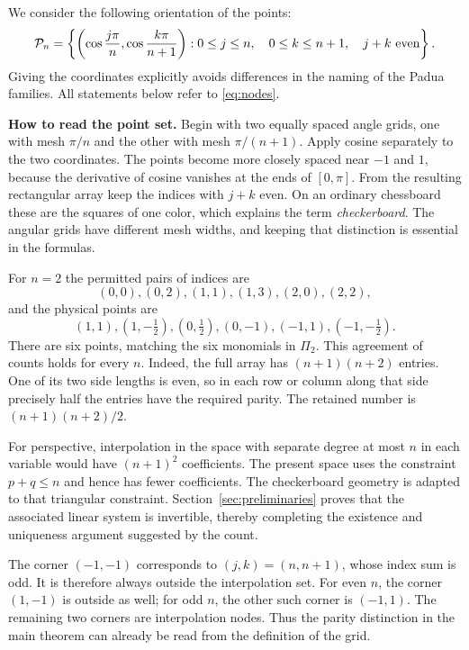We consider the following orientation of the points:
\begin{equation}\label{eq:nodes}
 \mathcal P_n=\left\{\left(\cos\frac{j\pi}{n},
                   \cos\frac{k\pi}{n+1}\right):
 0\leq j\leq n,\quad 0\leq k\leq n+1,\quad j+k\ \hbox{even}\right\}.
\end{equation}
Giving the coordinates explicitly avoids differences in the naming of the
Padua families. All statements below refer to \eqref{eq:nodes}.

\noindent\textbf{How to read the point set.}
Begin with two equally spaced angle grids, one with mesh $\pi/n$ and
the other with mesh $\pi/(n+1)$. Apply cosine separately to the two
coordinates. The points become more closely spaced near $-1$ and $1$,
because the derivative of cosine vanishes at the ends of $[0,\pi]$.
From the resulting rectangular array keep the indices with $j+k$ even.
On an ordinary chessboard these are the squares of one color, which
explains the term \emph{checkerboard}. The angular grids have different
mesh widths, and keeping that distinction is essential in the formulas.

For $n=2$ the permitted pairs of indices are
\[
 (0,0),(0,2),(1,1),(1,3),(2,0),(2,2),
\]
and the physical points are
\[
 (1,1),(1,-\tfrac12),(0,\tfrac12),(0,-1),
 (-1,1),(-1,-\tfrac12).
\]
There are six points, matching the six monomials in $\Pi_2$.
This agreement of counts holds for every $n$. Indeed, the full array has
$(n+1)(n+2)$ entries. One of its two side lengths is even, so in each row
or column along that side precisely half the entries have the required
parity. The retained number is $(n+1)(n+2)/2$.

For perspective, interpolation in the space with separate degree at
most $n$ in each variable would have $(n+1)^2$ coefficients. The present
space uses the constraint $p+q\leq n$ and hence has fewer coefficients.
The checkerboard geometry is adapted to that triangular constraint.
Section~\ref{sec:preliminaries} proves that the associated linear system
is invertible, thereby completing the existence and uniqueness argument
suggested by the count.

The corner $(-1,-1)$ corresponds to $(j,k)=(n,n+1)$, whose index sum
is odd. It is therefore always outside the interpolation set. For even
$n$, the corner $(1,-1)$ is outside as well; for odd $n$, the other such
corner is $(-1,1)$. The remaining two corners are interpolation nodes.
Thus the parity distinction in the main theorem can already be read
from the definition of the grid.


